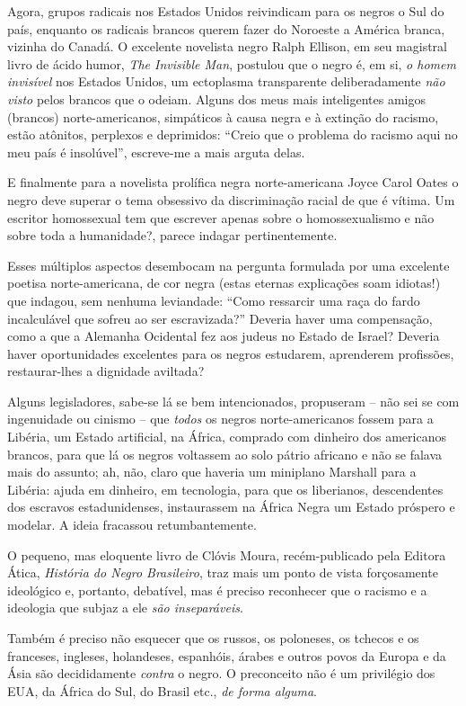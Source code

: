 \documentclass[
  letterpaper,
  DIV=11,
  numbers=noendperiod]{scrreprt}
\begin{document}
Agora, grupos radicais nos Estados Unidos reivindicam para os negros o
Sul do país, enquanto os radicais brancos querem fazer do Noroeste a
América branca, vizinha do Canadá. O excelente novelista negro Ralph
Ellison, em seu magistral livro de ácido humor, \emph{The Invisible
Man}, postulou que o negro é, em si, \emph{o homem invisível} nos
Estados Unidos, um ectoplasma transparente deliberadamente \emph{não
visto} pelos brancos que o odeiam. Alguns dos meus mais inteligentes
amigos (brancos) norte-americanos, simpáticos à causa negra e à extinção
do racismo, estão atônitos, perplexos e deprimidos: ``Creio que o
problema do racismo aqui no meu país é insolúvel'', escreve-me a mais
arguta delas.

E finalmente para a novelista prolífica negra norte-americana Joyce
Carol Oates o negro deve superar o tema obsessivo da discriminação
racial de que é vítima. Um escritor homossexual tem que escrever apenas
sobre o homossexualismo e não sobre toda a humanidade?, parece indagar
pertinentemente.

Esses múltiplos aspectos desembocam na pergunta formulada por uma
excelente poetisa norte-americana, de cor negra (estas eternas
explicações soam idiotas!) que indagou, sem nenhuma leviandade: ``Como
ressarcir uma raça do fardo incalculável que sofreu ao ser
escravizada?'' Deveria haver uma compensação, como a que a Alemanha
Ocidental fez aos judeus no Estado de Israel? Deveria haver
oportunidades excelentes para os negros estudarem, aprenderem
profissões, restaurar-lhes a dignidade aviltada?

Alguns legisladores, sabe-se lá se bem intencionados, propuseram -- não
sei se com ingenuidade ou cinismo -- que \emph{todos} os negros
norte-americanos fossem para a Libéria, um Estado artificial, na África,
comprado com dinheiro dos americanos brancos, para que lá os negros
voltassem ao solo pátrio africano e não se falava mais do assunto; ah,
não, claro que haveria um miniplano Marshall para a Libéria: ajuda em
dinheiro, em tecnologia, para que os liberianos, descendentes dos
escravos estadunidenses, instaurassem na África Negra um Estado próspero
e modelar. A ideia fracassou retumbantemente.

O pequeno, mas eloquente livro de Clóvis Moura, recém-publicado pela
Editora Ática, \emph{História do Negro Brasileiro}, traz mais um ponto
de vista forçosamente ideológico e, portanto, debatível, mas é preciso
reconhecer que o racismo e a ideologia que subjaz a ele \emph{são
inseparáveis}.

Também é preciso não esquecer que os russos, os poloneses, os tchecos e
os franceses, ingleses, holandeses, espanhóis, árabes e outros povos da
Europa e da Ásia são decididamente \emph{contra} o negro. O preconceito
não é um privilégio dos EUA, da África do Sul, do Brasil etc., \emph{de
forma alguma}.
\end{document}
